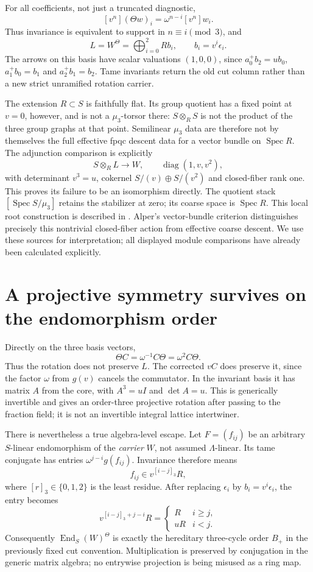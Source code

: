 \documentclass[11pt,oneside,openany]{book}
\theoremstyle{definition}\newtheorem{definition}[theorem]{Definition}
\theoremstyle{remark}\newtheorem{remark}[theorem]{Remark}
\begin{document}
For all coefficients, not just a truncated diagnostic,
\[
 [v^n](\Theta w)_i=\omega^{n-i}[v^n]w_i.
\]
Thus invariance is equivalent to support in $n\equiv i\pmod3$, and
\[
 L=W^\Theta=\bigoplus_{i=0}^2 Rb_i,\qquad b_i=v^i\epsilon_i.
\]
The arrows on this basis have scalar valuations $(1,0,0)$, since $a_0^+b_2=ub_0$, $a_1^+b_0=b_1$ and $a_2^+b_1=b_2$. Tame invariants return the old cut column rather than a new strict unramified rotation carrier.

The extension $R\subset S$ is faithfully flat. Its group quotient has a fixed point at $v=0$, however, and is not a $\mu_3$-torsor there: $S\otimes_R S$ is not the product of the three group graphs at that point. Semilinear $\mu_3$ data are therefore not by themselves the full effective fpqc descent data for a vector bundle on $\operatorname{Spec}R$. The adjunction comparison is explicitly
\[
 S\otimes_R L\longrightarrow W,\qquad
 \operatorname{diag}(1,v,v^2),
\]
with determinant $v^3=u$, cokernel $S/(v)\oplus S/(v^2)$ and closed-fiber rank one. This proves its failure to be an isomorphism directly. The quotient stack $[\operatorname{Spec}S/\mu_3]$ retains the stabilizer at zero; its coarse space is $\operatorname{Spec}R$. This local root construction is described in \cite{RootStackGuide}. Alper's vector-bundle criterion \cite[Theorem10.3, pp.2386--2387]{AlperDescent} distinguishes precisely this nontrivial closed-fiber action from effective coarse descent. We use these sources for interpretation; all displayed module comparisons have already been calculated explicitly.

\section{A projective symmetry survives on the endomorphism order}
Directly on the three basis vectors,
\[
 \Theta C=\omega^{-1}C\Theta=\omega^2C\Theta.
\]
Thus the rotation does not preserve $L$. The corrected $vC$ does preserve it, since the factor $\omega$ from $g(v)$ cancels the commutator. In the invariant basis it has matrix $A$ from the core, with $A^3=uI$ and $\det A=u$. This is generically invertible and gives an order-three projective rotation after passing to the fraction field; it is not an invertible integral lattice intertwiner.

There is nevertheless a true algebra-level escape. Let $F=(f_{ij})$ be an arbitrary $S$-linear endomorphism of the \emph{carrier} $W$, not assumed $\Lambda$-linear. Its tame conjugate has entries $\omega^{j-i}g(f_{ij})$. Invariance therefore means
\[
 f_{ij}\in v^{[i-j]_3}R,
\]
where $[r]_3\in\{0,1,2\}$ is the least residue. After replacing $\epsilon_i$ by $b_i=v^i\epsilon_i$, the entry becomes
\[
 v^{[i-j]_3+j-i}R=
 \begin{cases}R&i\ge j,\\uR&i<j.\end{cases}
\]
Consequently $\operatorname{End}_S(W)^\Theta$ is exactly the hereditary three-cycle order $B_+$ in the previously fixed cut convention. Multiplication is preserved by conjugation in the generic matrix algebra; no entrywise projection is being misused as a ring map.
\end{document}
